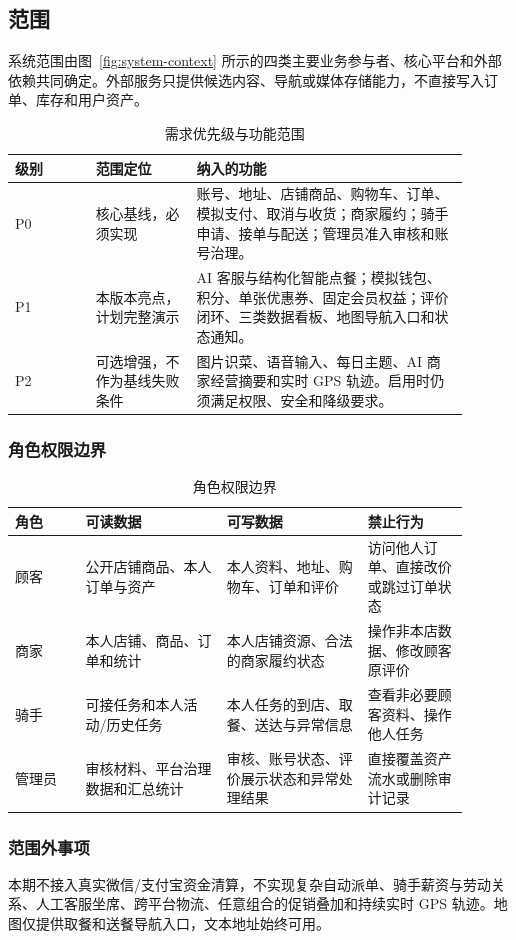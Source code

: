 \subsection{范围}

系统范围由图~\ref{fig:system-context} 所示的四类主要业务参与者、核心平台和外部依赖共同确定。外部服务只提供候选内容、导航或媒体存储能力，不直接写入订单、库存和用户资产。


\begin{longtable}{|L{0.16\linewidth}|L{0.20\linewidth}|L{0.54\linewidth}|}
\caption{需求优先级与功能范围}\label{tab:scope}\\ \hline
\textbf{级别} & \textbf{范围定位} & \textbf{纳入的功能} \\ \hline
P0 & 核心基线，必须实现 & 账号、地址、店铺商品、购物车、订单、模拟支付、取消与收货；商家履约；骑手申请、接单与配送；管理员准入审核和账号治理。 \\ \hline
P1 & 本版本亮点，计划完整演示 & AI 客服与结构化智能点餐；模拟钱包、积分、单张优惠券、固定会员权益；评价闭环、三类数据看板、地图导航入口和状态通知。 \\ \hline
P2 & 可选增强，不作为基线失败条件 & 图片识菜、语音输入、每日主题、AI 商家经营摘要和实时 GPS 轨迹。启用时仍须满足权限、安全和降级要求。 \\ \hline
\end{longtable}

\subsubsection{角色权限边界}

\begin{longtable}{|L{0.14\linewidth}|L{0.28\linewidth}|L{0.28\linewidth}|L{0.20\linewidth}|}
\caption{角色权限边界}\label{tab:role-permission}\\ \hline
\textbf{角色} & \textbf{可读数据} & \textbf{可写数据} & \textbf{禁止行为} \\ \hline
顾客 & 公开店铺商品、本人订单与资产 & 本人资料、地址、购物车、订单和评价 & 访问他人订单、直接改价或跳过订单状态 \\ \hline
商家 & 本人店铺、商品、订单和统计 & 本人店铺资源、合法的商家履约状态 & 操作非本店数据、修改顾客原评价 \\ \hline
骑手 & 可接任务和本人活动/历史任务 & 本人任务的到店、取餐、送达与异常信息 & 查看非必要顾客资料、操作他人任务 \\ \hline
管理员 & 审核材料、平台治理数据和汇总统计 & 审核、账号状态、评价展示状态和异常处理结果 & 直接覆盖资产流水或删除审计记录 \\ \hline
\end{longtable}

\subsubsection{范围外事项}

本期不接入真实微信/支付宝资金清算，不实现复杂自动派单、骑手薪资与劳动关系、人工客服坐席、跨平台物流、任意组合的促销叠加和持续实时 GPS 轨迹。地图仅提供取餐和送餐导航入口，文本地址始终可用。
